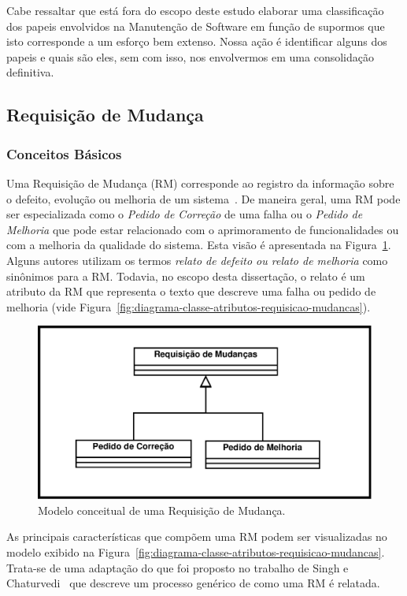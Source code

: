 Cabe ressaltar que está fora do escopo deste estudo elaborar uma classificação
dos papeis envolvidos na Manutenção de Software em função de supormos que isto
corresponde a um esforço bem extenso. Nossa ação é identificar alguns dos
papeis e quais são eles, sem com isso, nos envolvermos em uma consolidação
definitiva.

\subsection{Requisição de Mudança}\label{sec:requisicao_de_mudanca}

\subsubsection{Conceitos Básicos}\label{subsec:tipos_de_requisicoes_mudanca}

Uma Requisição de Mudança (RM) corresponde ao registro da informação sobre o
defeito, evolução ou melhoria de um sistema~\cite{tripathy2014software}. De
maneira geral, uma RM pode ser especializada como o \textit{Pedido de Correção}
de uma falha ou o \textit{Pedido de Melhoria} que pode estar relacionado com o
aprimoramento de funcionalidades ou com a melhoria da qualidade do sistema. Esta
visão é apresentada na Figura~\ref{fig:diagrama-classe-requisicao-mudancas}.
Alguns autores utilizam os termos \textit{relato de defeito ou relato de
    melhoria} como sinônimos para a RM\@. Todavia, no escopo desta dissertação,
o relato é um atributo da RM que representa o texto que descreve uma falha ou
pedido de melhoria (vide
Figura~\ref{fig:diagrama-classe-atributos-requisicao-mudancas}).

\begin{figure}[htpb]
	\centering
	\includegraphics[width=0.5\linewidth]{./chapter-manutencao-software-visao-geral/img/diagrama-classe-conceitual-requisicao-mudancas.pdf}
	\caption{Modelo conceitual de uma Requisição de Mudança.}\label{fig:diagrama-classe-requisicao-mudancas}
\end{figure}

As principais características que compõem uma RM podem ser visualizadas no
modelo exibido na
Figura~\ref{fig:diagrama-classe-atributos-requisicao-mudancas}. Trata-se de uma
adaptação do que foi proposto no trabalho de Singh e
Chaturvedi~\cite{singh2011bug} que descreve um processo genérico de como uma RM
é relatada.

